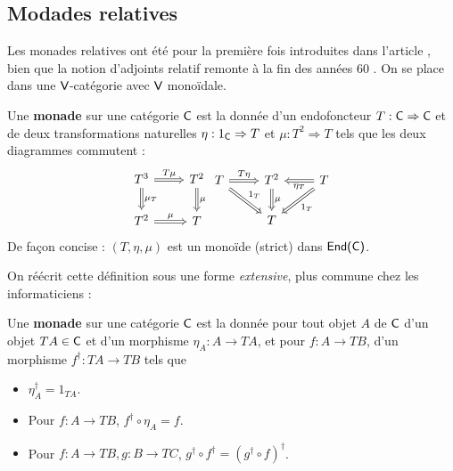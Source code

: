 \documentclass[8pt,a4paper,french,draft]{article}
\newcommand{\cat}[1]{\textcat{#1}}
\newcommand{\textcat}[1]{{\normalfont\textsf{#1}}}
\newcommand{\To}{\Rightarrow}
\theoremstyle{plain}
\theoremstyle{definition}
\theoremstyle{remark}
\begin{document}

\subsection{Modades relatives}

Les monades relatives ont été pour la première fois introduites dans l'article \cite{acu}, bien que la notion d'adjoints relatif remonte à la fin des années 60 \cite{ulmer}. On se place dans une $\cat{V}$-catégorie avec $\cat{V}$ monoïdale.

\begin{definition}
    Une \textbf{monade} sur une catégorie $\cat{C}$ est la donnée d'un endofoncteur $T : \cat{C} \To \cat{C}$ et de deux transformations naturelles $\eta : 1_\cat{C} \To T$ et $\mu : T^2 \To T$ tels que les deux diagrammes commutent :
    \[
        \begin{tikzcd}
            T^3 \ar[r, Rightarrow, "T\mu"] \ar[d, Rightarrow, "\mu_T"] & T^2 \ar[d, Rightarrow, "\mu"]\\
            T^2 \ar[r, Rightarrow, "\mu"] & T
        \end{tikzcd}
        \begin{tikzcd}
            T \ar[rd, Rightarrow, "1_T"] \ar[r, Rightarrow, "T\eta"] & T^2 \ar[d, Rightarrow, "\mu"] & T \ar[l, Rightarrow, "\eta_T"] \ar[ld, Rightarrow, "1_T"]\\
                                                                     & T
        \end{tikzcd}
    \]
    De façon concise : $(T, \eta, \mu)$ est un monoïde (strict) dans $\cat{End(C)}$.
\end{definition}

On réécrit cette définition sous une forme \textit{extensive}, plus commune chez les informaticiens :

\begin{definition}
    Une \textbf{monade} sur une catégorie $\cat{C}$ est la donnée pour tout objet $A$ de $\cat{C}$ d'un objet $TA \in \cat{C}$ et d'un morphisme $\eta_A : A \to TA$, et pour $f : A \to TB$, d'un morphisme $f^\dagger : TA \to TB$ tels que
    \begin{itemize}
        \item $\eta_A^\dagger = 1_{TA}$.
        \item Pour $f : A \to TB$, $f^\dagger \circ \eta_A = f$.
        \item Pour $f : A \to TB, g : B \to TC$, $g^\dagger \circ f^\dagger = (g^\dagger \circ f)^\dagger$.
    \end{itemize}
\end{definition}
\end{document}
